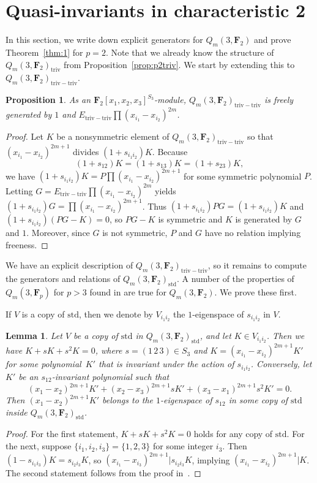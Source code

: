 \documentclass[11pt]{article}
\numberwithin{equation}{section}
\newtheorem{Lemma}[Theorem]{Lemma}
\newtheorem{Proposition}[Theorem]{Proposition}
\theoremstyle{definition}
\numberwithin{equation}{section}
\newcommand{\triv}{\mathrm{triv}}
\newcommand{\std}{\mathrm{std}}
\newcommand{\trtr}{\mathrm{triv-triv}}
\begin{document}
\setcounter{section}{2}
\section[Quasi-invariants in characteristic 2]{Quasi-invariants in characteristic 2}\label{sec:p=2}

In this section, we write down explicit generators for $Q_m(3,\mathbf{F}_2)$ and prove Theorem~\ref{thm:1} for $p=2$. Note that we already know the structure of $Q_m(3,\mathbf{F}_2)_\triv$ from Proposition~\ref{prop:p2triv}. We start by extending this to $Q_m(3,\mathbf{F}_2)_\trtr$.

\begin{Proposition}\label{prop:trivtriv}
 As an $\mathbf{F}_2[x_1,x_2,x_3]^{S_3}$-module, $Q_m(3,\mathbf{F}_2)_{\triv-\triv}$ is freely generated by $1$ and $E_{\trtr}\prod(x_{i_1}-x_{i_2})^{2m}$.
\end{Proposition}
\begin{proof}
 Let $K$ be a nonsymmetric element of $Q_m(3,\mathbf{F}_2)_{\triv-\triv}$ so that $(x_{i_1}-x_{i_2})^{2m+1}$ divides $(1+s_{i_1i_2})K$. Because
 \[(1+s_{12})K=(1+s_{13})K=(1+s_{23})K,\]
 we have $(1+s_{i_1i_2})K = P\prod (x_{i_1}-x_{i_2})^{2m+1}$ for some symmetric polynomial $P$. Letting $G=E_{\trtr}\prod (x_{i_1}-x_{i_2})^{2m}$ yields $(1+s_{i_1i_2})G = \prod (x_{i_1}-x_{i_2})^{2m+1}$. Thus $(1+s_{i_1i_2})PG = (1+s_{i_1i_2})K$ and $(1+s_{i_1i_2})(PG-K)=0$, so $PG-K$ is symmetric and $K$ is generated by $G$ and $1$. Moreover, since $G$ is not symmetric, $P$ and $G$ have no relation implying freeness.
\end{proof}

We have an explicit description of $Q_m(3,\mathbf{F}_2)_\trtr$, so it remains to compute the generators and relations of $Q_m(3,\mathbf{F}_2)_\std$. A number of the properties of $Q_m(3,\mathbf{F}_p)$ for $p>3$ found in \cite{wang2022explicit} are true for $Q_m(3,\mathbf{F}_2)$. We prove these first.

If $V$ is a copy of $\std$, then we denote by $V_{i_1i_2}$ the $1$-eigenspace of $s_{i_1i_2}$ in $V$.

\begin{Lemma}
 Let $V$ be a copy of $\std$ in $Q_m(3,\mathbf{F}_2)_{\std}$, and let $K\in V_{i_1i_2}$. Then we have ${K+sK+s^2K}=0$, where $s=(1\,2\,3)\in S_3$ and $K=(x_{i_1}-x_{i_2})^{2m+1}K'$ for some polynomial~$K'$ that is invariant under the action of $s_{i_1i_2}$. Conversely, let $K'$ be an $s_{12}$-invariant polynomial such that
 \[(x_1-x_2)^{2m+1}K'+(x_2-x_3)^{2m+1}sK'+(x_3-x_1)^{2m+1}s^2K'=0.\]
 Then $(x_1-x_2)^{2m+1}K'$ belongs to the $1$-eigenspace of $s_{12}$ in some copy of $\std$ inside $Q_m(3,\mathbf{F}_2)_\std$.
\end{Lemma}
\begin{proof}
 For the first statement, $K+sK+s^2K=0$ holds for any copy of $\std$. For the next, suppose $\{i_1,i_2,i_3\} = \{1,2,3\}$ for some integer $i_3$. Then $(1-s_{i_1i_3})K = s_{i_2i_3}K$, so $(x_{i_1}-x_{i_3})^{2m+1}|s_{i_2i_3}K$, implying $(x_{i_1}-x_{i_2})^{2m+1}|K$.
 The second statement follows from the proof in~\cite{wang2022explicit}.
\end{proof}
\end{document}
